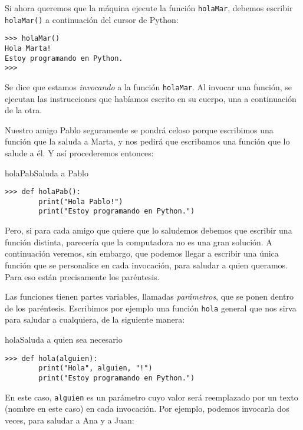 Si ahora queremos que la máquina ejecute la función
\lstinline!holaMar!, debemos escribir \lstinline!holaMar()! a continuación
del cursor de Python:

\begin{lstlisting}[numbers=none]
>>> holaMar()
Hola Marta!
Estoy programando en Python.
>>>
\end{lstlisting}

Se dice que estamos {\it invocando} a la función \lstinline!holaMar!.
Al invocar una función, se ejecutan las instrucciones que habíamos
escrito en su cuerpo, una a continuación de la otra.

Nuestro amigo Pablo seguramente se pondrá celoso porque escribimos
una función que la saluda a Marta, y nos pedirá que escribamos una
función que lo salude a él. Y así procederemos entonces:

\begin{codigo}{holaPab}{Saluda a Pablo}
\begin{lstlisting}[numbers=none]
>>> def holaPab():
        print("Hola Pablo!")
        print("Estoy programando en Python.")
\end{lstlisting}
\end{codigo}

Pero, si para cada amigo que quiere que lo saludemos debemos que
escribir una función distinta, parecería que la computadora no es
una gran solución. A continuación veremos, sin embargo, que
podemos llegar a escribir una única función que se personalice en
cada invocación, para saludar a quien queramos. Para eso están
precisamente los paréntesis.

Las funciones tienen partes variables, llamadas {\it parámetros},
que se ponen dentro de los paréntesis. Escribimos por ejemplo una
función \lstinline!hola! general que nos sirva para saludar a
cualquiera, de la siguiente manera:

\begin{codigo}{hola}{Saluda a quien sea necesario}
\begin{lstlisting}[numbers=none]
>>> def hola(alguien):
        print("Hola", alguien, "!")
        print("Estoy programando en Python.")
\end{lstlisting}
\end{codigo}

En este caso, \lstinline!alguien! es un parámetro cuyo valor será reemplazado
por un texto (nombre en este caso) en cada invocación.  Por ejemplo, podemos
invocarla dos veces, para saludar a Ana y a Juan:


